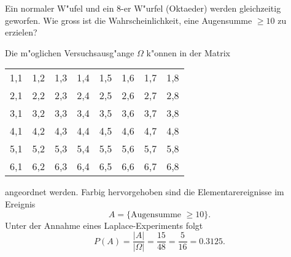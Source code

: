 Ein normaler W"ufel und ein 8-er W"urfel (Oktaeder) werden gleichzeitig
geworfen. 
Wie gross ist die Wahrscheinlichkeit, eine Augensumme $\ge 10$ zu erzielen?

\begin{loesung}
Die m"oglichen Versuchsausg"ange $\Omega$ k"onnen in der Matrix
\begin{center}
\begin{tabular}{|cccccccc|}
\hline
1,1&1,2&1,3&1,4&1,5&1,6&1,7&1,8\\
2,1&2,2&2,3&2,4&2,5&2,6&2,7&\color{red}2,8\\
3,1&3,2&3,3&3,4&3,5&3,6&\color{red}3,7&\color{red}3,8\\
4,1&4,2&4,3&4,4&4,5&\color{red}4,6&\color{red}4,7&\color{red}4,8\\
5,1&5,2&5,3&5,4&\color{red}5,5&\color{red}5,6&\color{red}5,7&\color{red}5,8\\
6,1&6,2&6,3&\color{red}6,4&\color{red}6,5&\color{red}6,6&\color{red}6,7&\color{red}6,8\\
\hline
\end{tabular}
\end{center}
angeordnet werden.
Farbig hervorgehoben sind die Elementarereignisse im Ereignis
\[
A=\{\text{Augensumme $\ge 10$}\}.
\]
Unter der Annahme eines Laplace-Experiments folgt
\[
P(A)=\frac{|A|}{|\Omega|}=\frac{15}{48}=\frac{5}{16}=0.3125.
\]
\end{loesung}

